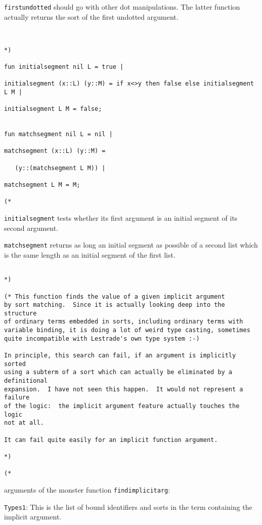 \documentclass{article}
\begin{document}
{\tt firstundotted} should go with other dot manipulations.  The latter function actually returns the sort
of the first undotted argument.

\begin{verbatim}


*)

fun initialsegment nil L = true |

initialsegment (x::L) (y::M) = if x<>y then false else initialsegment L M |

initialsegment L M = false;


fun matchsegment nil L = nil |

matchsegment (x::L) (y::M) =

   (y::(matchsegment L M)) |

matchsegment L M = M;

(*

\end{verbatim}

{\tt initialsegment} tests whether its first argument is an initial segment of its second argument.

{\tt matchsegment} returns as long an initial segment as possible of a second list which is the same length as an initial segment of the first list.

\begin{verbatim}

*)

(* This function finds the value of a given implicit argument
by sort matching.  Since it is actually looking deep into the structure
of ordinary terms embedded in sorts, including ordinary terms with
variable binding, it is doing a lot of weird type casting, sometimes
quite incompatible with Lestrade's own type system :-) 

In principle, this search can fail, if an argument is implicitly sorted
using a subterm of a sort which can actually be eliminated by a definitional
expansion.  I have not seen this happen.  It would not represent a failure
of the logic:  the implicit argument feature actually touches the logic
not at all.  

It can fail quite easily for an implicit function argument.

*)

(*

\end{verbatim}

arguments of the monster function {\tt findimplicitarg}:

{\tt Types1}:  This is the list of bound identifiers and sorts in the term containing the implicit argument.
\end{document}
